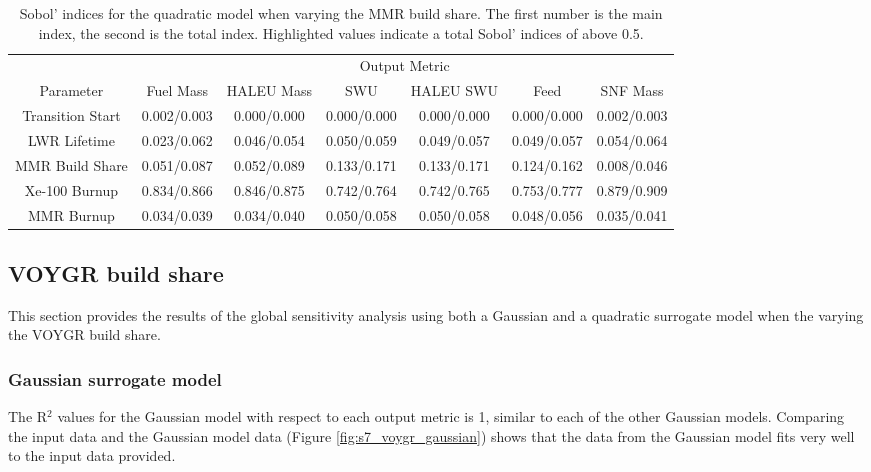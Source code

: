 \begin{table}
    \centering
    \caption{Sobol' indices for the quadratic model when varying the MMR 
    build share. The first number is the main index, the second is the total 
    index. Highlighted 
    values indicate a total Sobol' indices of above 0.5.}
    \label{tab:s7_sobol_mmr_quadratic}
    \begin{tabular}{c c c c c c c}
        \hline
        & \multicolumn{6}{c}{Output Metric} \\
        Parameter & Fuel Mass & HALEU Mass & SWU & HALEU SWU & Feed & SNF Mass \\
        \hline
        Transition Start & 0.002/0.003 & 0.000/0.000 & 0.000/0.000 &
                        0.000/0.000 & 0.000/0.000 & 0.002/0.003\\
        LWR Lifetime & 0.023/0.062 & 0.046/0.054 & 0.050/0.059 &
                       0.049/0.057 & 0.049/0.057 & 0.054/0.064\\
        MMR Build Share & 0.051/0.087 & 0.052/0.089 & 0.133/0.171 &
                          0.133/0.171 & 0.124/0.162 & 0.008/0.046\\
        Xe-100 Burnup & \cellcolor{green!25}0.834/0.866 & \cellcolor{green!25}0.846/0.875 & \cellcolor{green!25}0.742/0.764 &
        \cellcolor{green!25}0.742/0.765 & \cellcolor{green!25}0.753/0.777 & \cellcolor{green!25}0.879/0.909\\
        MMR Burnup & 0.034/0.039 & 0.034/0.040 & 0.050/0.058 & 
                     0.050/0.058 & 0.048/0.056 & 0.035/0.041\\
        \hline        
    \end{tabular}
\end{table}

\subsection{VOYGR build share}
This section provides the results of the global sensitivity analysis using 
both a Gaussian and a quadratic surrogate model when the varying the 
VOYGR build share. 

\subsubsection{Gaussian surrogate model}
The R$^2$ values for the Gaussian model with respect to 
each output metric is 1, similar to each of the other Gaussian 
models. Comparing the input data and the Gaussian model data 
(Figure \ref{fig:s7_voygr_gaussian}) shows that the data from the 
Gaussian model fits very well to the input data provided. 

